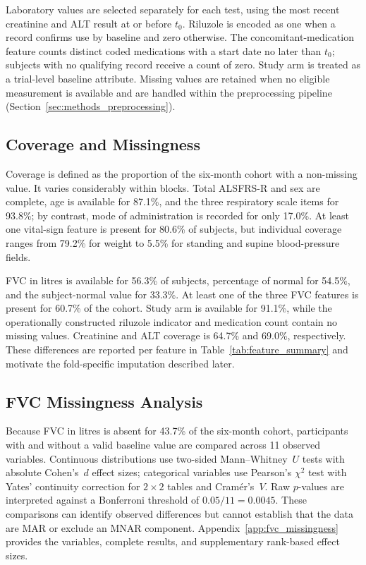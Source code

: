 Laboratory values are selected separately for each test, using the most recent creatinine and \gls{ALT} result at or before $t_0$. Riluzole is encoded as one when a record confirms use by baseline and zero otherwise. The concomitant-medication feature counts distinct coded medications with a start date no later than $t_0$; subjects with no qualifying record receive a count of zero. Study arm is treated as a trial-level baseline attribute. Missing values are retained when no eligible measurement is available and are handled within the preprocessing pipeline (Section~\ref{sec:methods_preprocessing}).

\subsection{Coverage and Missingness}
\label{sec:methods_coverage}
Coverage is defined as the proportion of the six-month cohort with a non-missing value. It varies considerably within blocks. Total \gls{ALSFRS-R} and sex are complete, age is available for 87.1\%, and the three respiratory scale items for 93.8\%; by contrast, mode of administration is recorded for only 17.0\%. At least one vital-sign feature is present for 80.6\% of subjects, but individual coverage ranges from 79.2\% for weight to 5.5\% for standing and supine blood-pressure fields.

FVC in litres is available for 56.3\% of subjects, percentage of normal for 54.5\%, and the subject-normal value for 33.3\%. At least one of the three FVC features is present for 60.7\% of the cohort. Study arm is available for 91.1\%, while the operationally constructed riluzole indicator and medication count contain no missing values. Creatinine and \gls{ALT} coverage is 64.7\% and 69.0\%, respectively. These differences are reported per feature in Table~\ref{tab:feature_summary} and motivate the fold-specific imputation described later.

\subsection{FVC Missingness Analysis}
\label{subsec:methods_fvc_missingness}
Because FVC in litres is absent for 43.7\% of the six-month cohort, participants with and without a valid baseline value are compared across 11 observed variables. Continuous distributions use two-sided Mann--Whitney~$U$ tests with absolute Cohen's~$d$ effect sizes; categorical variables use Pearson's $\chi^2$ test with Yates' continuity correction for $2\times2$ tables and Cram\'er's~$V$. Raw $p$-values are interpreted against a Bonferroni threshold of $0.05/11=0.0045$. These comparisons can identify observed differences but cannot establish that the data are \gls{MAR} or exclude an \gls{MNAR} component. Appendix~\ref{app:fvc_missingness} provides the variables, complete results, and supplementary rank-based effect sizes.


